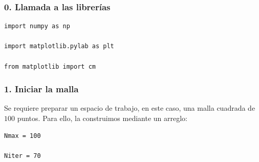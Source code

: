 \documentclass[12pt]{beamer}
\begin{document}
{
\begin{frame}[fragile]
\frametitle{0. Llamada a las librerías}
\begin{lstlisting}[caption=Llamando a las librerías que se utilizarán, style=FormattedNumber, basicstyle=\linespread{1.1}\ttfamily=\small, columns=fullflexible]
import numpy as np

import matplotlib.pylab as plt

from matplotlib import cm
\end{lstlisting}
\end{frame}
\begin{frame}[fragile]
\frametitle{1. Iniciar la malla}
Se requiere preparar un espacio de trabajo, en este caso, una malla cuadrada de $100$ puntos. Para ello, la construimos mediante un arreglo:
\\
\bigskip
\begin{lstlisting}[caption=Construyendo la malla, style=FormattedNumber, basicstyle=\linespread{1.1}\ttfamily=\small, columns=fullflexible]
Nmax = 100

Niter = 70


\end{lstlisting}
\end{frame}}
\end{document}
